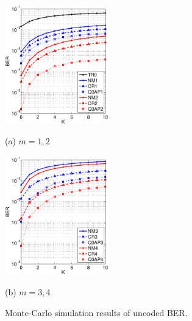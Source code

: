 \documentclass[journal]{IEEEtran}
\begin{document}
\begin{figure}[!t]
  \begin{minipage}[b]{.48\linewidth}
    \centering
    \centerline{\includegraphics[width=4.5cm]{./figs/BER_K_MonteCarlo_64QAM_12.eps}}
    \centerline{(a) $m=1,2$}\medskip
  \end{minipage}
  \hfill
  \begin{minipage}[b]{0.48\linewidth}
    \centering
    \centerline{\includegraphics[width=4.5cm]{./figs/BER_K_MonteCarlo_64QAM_34.eps}}
    \centerline{(b) $m=3,4$}\medskip
  \end{minipage}
  \vspace{-10pt}
  \caption{Monte-Carlo simulation results of uncoded BER.}
  \label{fig:uncoded_K_mc}
\end{figure}
\end{document}
